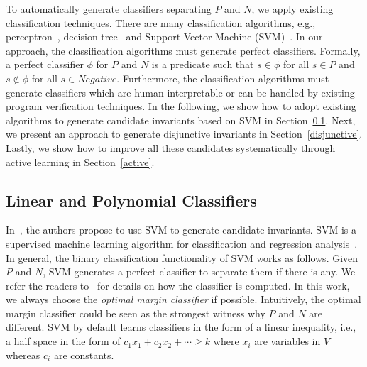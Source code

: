 To automatically generate classifiers separating $P$ and $N$, we apply existing classification techniques. There are many classification algorithms, e.g., perceptron~\cite{perceptron}, decision tree~\cite{quinlan1986induction} and Support Vector Machine (SVM)~\cite{svm:original}.
In our approach, the classification algorithms must generate perfect classifiers. Formally, a perfect classifier $\phi$ for $P$ and $N$ is a predicate such that $s \in \phi$ for all $s \in P$ and $s \not \in \phi$ for all $s \in Negative$. Furthermore, the classification algorithms must generate classifiers which are human-interpretable or can be handled by existing program verification techniques.
In the following, we show how to adopt existing algorithms to generate candidate invariants based on SVM in Section~\ref{existing}. Next, we present an approach to generate disjunctive invariants in Section~\ref{disjunctive}. Lastly, we show how to improve all these candidates systematically through active learning in Section~\ref{active}.

\subsection{Linear and Polynomial Classifiers} \label{existing}
In~\cite{sharma2012interpolants}, the authors propose to use SVM to generate candidate invariants. SVM is a supervised machine learning algorithm for classification and regression analysis~\cite{svm:original}.
In general, the binary classification functionality of SVM works as follows. Given $P$ and $N$, SVM generates a perfect classifier to separate them if there is any.
We refer the readers to~\cite{svm:smo} for details on how the classifier is computed. In this work, we always choose the \textit{optimal margin classifier} if possible. Intuitively, the optimal margin classifier could be seen as the strongest witness why $P$ and $N$ are different.
SVM by default learns classifiers in the form of a linear inequality, i.e., a half space in the form of $c_1x_1 + c_2x_2 + \cdots \geq k$ where $x_i$ are variables in $V$ whereas $c_i$ are constants.


